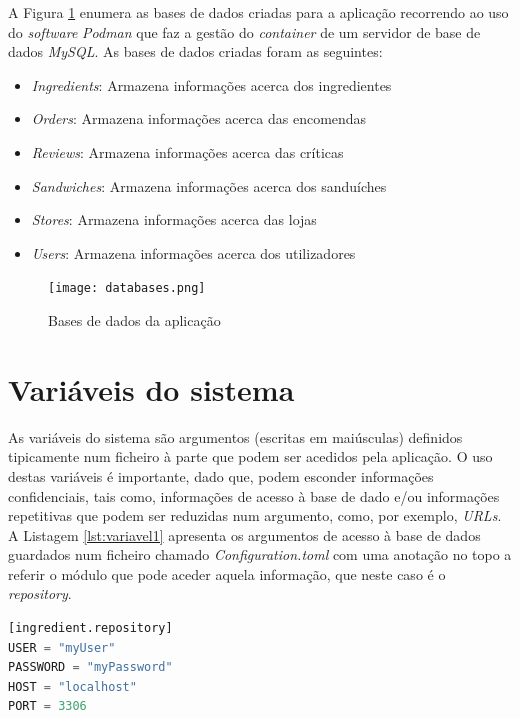 A Figura \ref{fig:databases} enumera as bases de dados criadas para a aplicação recorrendo ao uso do \textit{software} \textit{Podman} que faz a gestão do \textit{container} de um servidor de base de dados \textit{MySQL}. As bases de dados criadas foram as seguintes:
\begin{itemize}
    \item \textit{Ingredients}: Armazena informações acerca dos ingredientes
    \item \textit{Orders}: Armazena informações acerca das encomendas
    \item \textit{Reviews}: Armazena informações acerca das críticas
    \item \textit{Sandwiches}: Armazena informações acerca dos sanduíches
    \item \textit{Stores}: Armazena informações acerca das lojas
    \item \textit{Users}: Armazena informações acerca dos utilizadores
\end{itemize}

\begin{figure}[H]
	\centering
	\texttt{[image: databases.png]}
	\caption{Bases de dados da aplicação}
	\label{fig:databases}
\end{figure}

\section{Variáveis do sistema}

As variáveis do sistema são argumentos (escritas em maiúsculas) definidos tipicamente num ficheiro à parte que podem ser acedidos pela aplicação. O uso destas variáveis é importante, dado que, podem esconder informações confidenciais, tais como, informações de acesso à base de dado e/ou informações repetitivas que podem ser reduzidas num argumento, como, por exemplo, \textit{URLs}. A Listagem \ref{lst:variavel1} apresenta os argumentos de acesso à base de dados guardados num ficheiro chamado \textit{Configuration.toml} com uma anotação no topo a referir o módulo que pode aceder aquela informação, que neste caso é o \textit{repository}.

\begin{minipage}{0.9\linewidth}
\begin{lstlisting}[language=python, caption=Definição de variáveis do sistema., label=lst:variavel1]
[ingredient.repository]
USER = "myUser"
PASSWORD = "myPassword"
HOST = "localhost"
PORT = 3306
\end{lstlisting}
\end{minipage}


